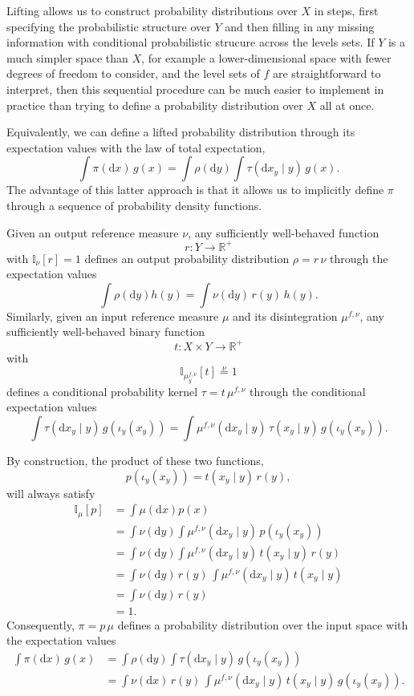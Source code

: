 \documentclass[
  letterpaper,
  DIV=11,
  numbers=noendperiod]{scrartcl}
\begin{document}
Lifting allows us to construct probability distributions over \(X\) in
steps, first specifying the probabilistic structure over \(Y\) and then
filling in any missing information with conditional probabilistic
strucure across the levels sets. If \(Y\) is a much simpler space than
\(X\), for example a lower-dimensional space with fewer degrees of
freedom to consider, and the level sets of \(f\) are straightforward to
interpret, then this sequential procedure can be much easier to
implement in practice than trying to define a probability distribution
over \(X\) all at once.

Equivalently, we can define a lifted probability distribution through
its expectation values with the law of total expectation, \[
\int \pi( \mathrm{d} x ) \, g(x)
=
\int \rho (\mathrm{d} y)
\int \tau( \mathrm{d}x_{y} \mid y ) \, g(x).
\] The advantage of this latter approach is that it allows us to
implicitly define \(\pi\) through a sequence of probability density
functions.

Given an output reference measure \(\nu\), any sufficiently well-behaved
function \[
r : Y \rightarrow \mathbb{R}^{+}
\] with \(\mathbb{I}_{\nu}[ r ] = 1\) defines an output probability
distribution \(\rho = r \, \nu\) through the expectation values \[
\int \rho( \mathrm{d} y ) h(y)
=
\int \nu (\mathrm{d} y) \, r(y) \, h(y).
\] Similarly, given an input reference measure \(\mu\) and its
disintegration \(\mu^{f, \nu}\), any sufficiently well-behaved binary
function \[
t : X \times Y \rightarrow \mathbb{R}^{+}
\] with \[
\mathbb{I}_{\mu^{f, \nu}_{y}}[ t ] \overset{\nu}{=} 1
\] defines a conditional probability kernel \(\tau = t \, \mu^{f, \nu}\)
through the conditional expectation values \[
\int \tau( \mathrm{d} x_{y} \mid y) \,
g( \iota_{y}(x_{y}) )
=
\int \mu^{f, \nu}( \mathrm{d} x_{y} \mid y) \,
\tau(x_{y} \mid y) \, g( \iota_{y}(x_{y}) ).
\]

By construction, the product of these two functions, \[
p( \iota_{y}(x_{y}) ) = t(x_{y} \mid y ) \, r( y ),
\] will always satisfy \begin{align*}
\mathbb{I}_{\mu} [ p ]
&=
\int \mu( \mathrm{d} x) p(x)
\\
&=
\int \nu( \mathrm{d} y)
\int \mu^{f, \nu}( \mathrm{d}x_{y} \mid y ) \,
p( \iota_{y}(x_{y}) )
\\
&=
\int \nu( \mathrm{d} y)
\int \mu^{f, \nu}( \mathrm{d}x_{y} \mid y ) \,
t(x_{y} \mid y ) \, r( y )
\\
&=
\int \nu( \mathrm{d} y) \, r( y ) \,
\int \mu^{f, \nu}( \mathrm{d}x_{y} \mid y ) \, t(x_{y} \mid y )
\\
&=
\int \nu( \mathrm{d} y) \, r( y )
\\
&=
1.
\end{align*} Consequently, \(\pi = p \, \mu\) defines a probability
distribution over the input space with the expectation values
\begin{align*}
\int \pi( \mathrm{d}x ) \, g(x)
&=
\int \rho (\mathrm{d}y)
\int \tau( \mathrm{d}x_{y} \mid y ) \, g( \iota_{y}(x_{y}) )
\\
&=
\int \nu (\mathrm{d}x ) \, r(y) \,
\int \mu^{f, \nu}( \mathrm{d}x_{y} \mid y) \,
t(x_{y} \mid y) \, g( \iota_{y}(x_{y}) ).
\end{align*}
\end{document}
